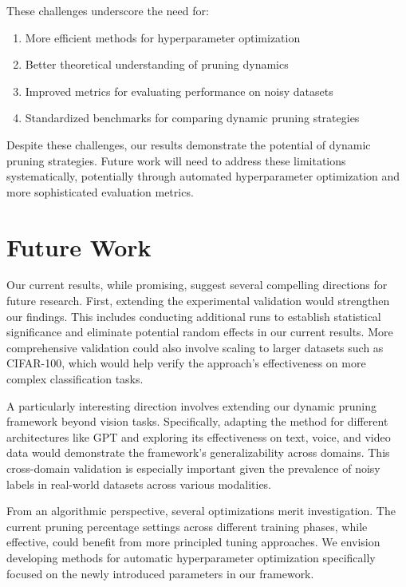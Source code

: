 \documentclass{article}
\begin{document}
These challenges underscore the need for:

\begin{enumerate}
    \item More efficient methods for hyperparameter optimization
    \item Better theoretical understanding of pruning dynamics
    \item Improved metrics for evaluating performance on noisy datasets
    \item Standardized benchmarks for comparing dynamic pruning strategies
\end{enumerate}

Despite these challenges, our results demonstrate the potential of dynamic pruning strategies. Future work will need to address these limitations systematically, potentially through automated hyperparameter optimization and more sophisticated evaluation metrics.

\section{Future Work}

Our current results, while promising, suggest several compelling directions for future research. First, extending the experimental validation would strengthen our findings. This includes conducting additional runs to establish statistical significance and eliminate potential random effects in our current results. More comprehensive validation could also involve scaling to larger datasets such as CIFAR-100, which would help verify the approach's effectiveness on more complex classification tasks.

A particularly interesting direction involves extending our dynamic pruning framework beyond vision tasks. Specifically, adapting the method for different architectures like GPT and exploring its effectiveness on text, voice, and video data would demonstrate the framework's generalizability across domains. This cross-domain validation is especially important given the prevalence of noisy labels in real-world datasets across various modalities.

From an algorithmic perspective, several optimizations merit investigation. The current pruning percentage settings across different training phases, while effective, could benefit from more principled tuning approaches. We envision developing methods for automatic hyperparameter optimization specifically focused on the newly introduced parameters in our framework.
\end{document}
